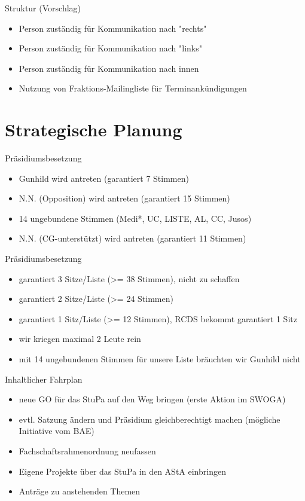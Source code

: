 \documentclass{beamer}
\begin{document}
\begin{frame}{Struktur (Vorschlag)}
    \begin{itemize}
        \item Person zuständig für Kommunikation nach "rechts"
        \item Person zuständig für Kommunikation nach "links"
        \item Person zuständig für Kommunikation nach innen
        \item Nutzung von Fraktions-Mailingliste für Terminankündigungen
    \end{itemize}
\end{frame}

\section{Strategische Planung}

\begin{frame}{Präsidiumsbesetzung}
    \begin{itemize}
        \item Gunhild wird antreten (garantiert 7 Stimmen)
        \item N.N. (Opposition) wird antreten (garantiert 15 Stimmen)
        \item 14 ungebundene Stimmen (Medi*, UC, LISTE, AL, CC, Jusos)
        \item N.N. (CG-unterstützt) wird antreten (garantiert 11 Stimmen)
    \end{itemize}
\end{frame}

\begin{frame}{Präsidiumsbesetzung}
    \begin{itemize}
        \item garantiert 3 Sitze/Liste (>= 38 Stimmen), nicht zu schaffen
        \item garantiert 2 Sitze/Liste (>= 24 Stimmen)
        \item garantiert 1 Sitz/Liste (>= 12 Stimmen), RCDS bekommt garantiert 1 Sitz
        \item wir kriegen maximal 2 Leute rein
        \item mit 14 ungebundenen Stimmen für unsere Liste bräuchten wir Gunhild
              nicht
    \end{itemize}
\end{frame}

\begin{frame}{Inhaltlicher Fahrplan}
    \begin{itemize}
        \item neue GO für das StuPa auf den Weg bringen (erste Aktion im SWOGA)
        \item evtl. Satzung ändern und Präsidium gleichberechtigt machen
              (mögliche Initiative vom BAE)
        \item Fachschaftsrahmenordnung neufassen
        \item Eigene Projekte über das StuPa in den AStA einbringen
        \item Anträge zu anstehenden Themen
    \end{itemize}
\end{frame}
\end{document}
